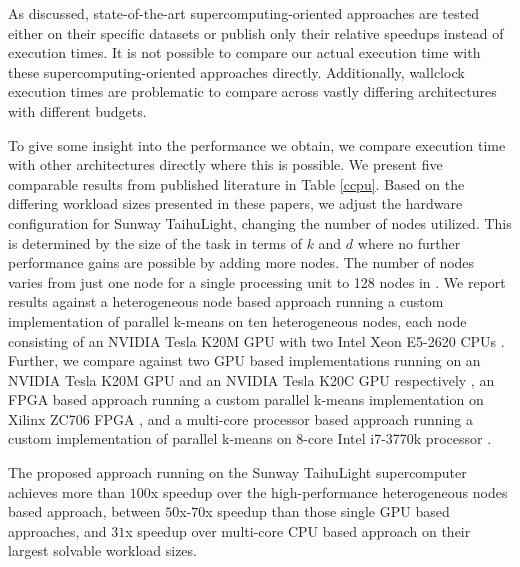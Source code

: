 \documentclass[10pt,journal,compsoc]{IEEEtran}
\begin{document}
As discussed, state-of-the-art supercomputing-oriented approaches are tested either on their specific datasets \cite{kumar2011parallel,cai2015grouping} or publish only their relative speedups \cite{bender2015k} instead of execution times. It is not possible to compare our actual execution time with these supercomputing-oriented approaches directly. Additionally, wallclock execution times are problematic to compare across vastly differing architectures with different budgets.

To give some insight into the performance we obtain, we compare execution time with other architectures directly where this is possible. We present five comparable results from published literature in Table \ref{ccpu}. Based on the differing workload sizes presented in these papers, we adjust the hardware configuration for Sunway TaihuLight, changing the number of nodes utilized. This is determined by the size of the task in terms of $k$ and $d$ where no further performance gains are possible by adding more nodes. The number of nodes varies from just one node for a single processing unit \cite{jin2018high,li2016high} to 128 nodes in \cite{rossbach2013dandelion}.
We report results against a heterogeneous node based approach running a custom implementation of parallel k-means on ten heterogeneous nodes, each node consisting of an NVIDIA Tesla K20M GPU with two Intel Xeon E5-2620 CPUs \cite{rossbach2013dandelion}. Further, we compare against two GPU based implementations  running on an NVIDIA Tesla K20M GPU and an NVIDIA Tesla K20C GPU respectively \cite{bhimani2015accelerating, jin2018high}, an FPGA based approach running a custom parallel k-means implementation on Xilinx ZC706 FPGA \cite{li2016high}, and a multi-core processor based approach running a custom implementation of parallel k-means on 8-core Intel i7-3770k processor \cite{ding2015yinyang}.

The proposed approach running on the Sunway TaihuLight supercomputer achieves more than $100$x speedup over the high-performance heterogeneous nodes based approach, between $50$x-$70$x speedup than those single GPU based approaches, and $31$x speedup over multi-core CPU based approach on their largest solvable workload sizes. 
\end{document}
